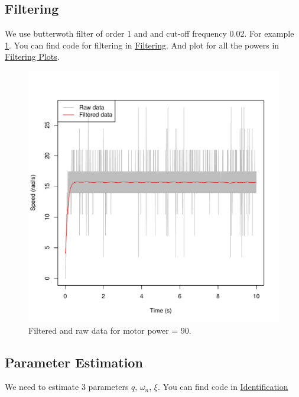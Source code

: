 \documentclass[a4paper,12pt,oneside]{article}
\begin{document}
\subsection {Filtering}
We use butterwoth filter of order 1 and and cut-off frequency 0.02. For example \cref{fig:filtered}. You can find code for filtering in \href{https://github.com/AliaksandrSiarohin/AppliedRobotics/tree/master/identification/filtering.r}{Filtering}. And plot for all the powers in \href{https://github.com/AliaksandrSiarohin/AppliedRobotics/tree/master/motor_data/plots/filtering}{Filtering Plots}.
\begin{figure}[t]%
	\centering
	\includegraphics[width=\columnwidth]{../motor_data/plots/filtering/90}
	\caption{Filtered and raw data for motor power = 90.}%
	\label{fig:filtered}%
\end{figure}

\subsection {Parameter Estimation}
We need to estimate 3 parameters $q$, $\omega_{n}$, $\xi$. You can find code in \href{https://github.com/AliaksandrSiarohin/AppliedRobotics/tree/master/identification/identification.r}{Identification}
\end{document}
